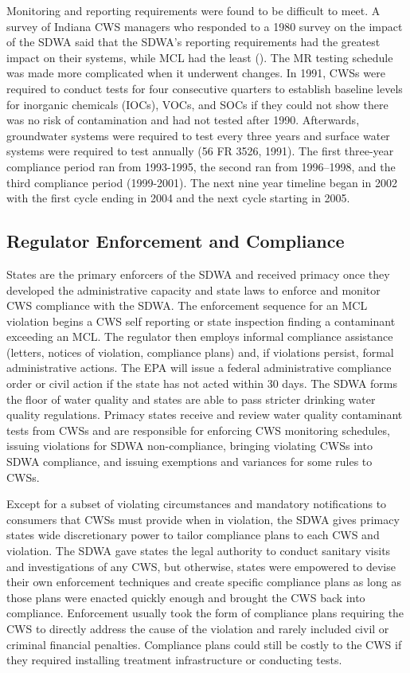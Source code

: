 \documentclass{article}
\begin{document}
Monitoring and reporting requirements were found to be difficult to meet. A survey of Indiana CWS managers who responded to a 1980 survey on the impact of the SDWA said that the SDWA's reporting requirements had the greatest impact on their systems, while MCL had the least (\cite{oleckno1982national}). The MR testing schedule was made more complicated when it underwent changes. In 1991, CWSs were required to conduct tests for four consecutive quarters to establish baseline levels for inorganic chemicals (IOCs), VOCs, and SOCs if they could not show there was no risk of contamination and had not tested after 1990. Afterwards, groundwater systems were required to test every three years and surface water systems were required to test annually (56 FR 3526, 1991). The first three-year compliance period ran from 1993-1995, the second ran from 1996–1998, and the third compliance period (1999-2001). The next nine year timeline began in 2002 with the first cycle ending in 2004 and the next cycle starting in 2005.

\subsection{Regulator Enforcement and Compliance}

States are the primary enforcers of the SDWA and received primacy once they developed the administrative capacity and state laws to enforce and monitor CWS compliance with the SDWA. The enforcement sequence for an MCL violation begins a CWS self reporting or state inspection finding a contaminant exceeding an MCL. The regulator then employs informal compliance assistance (letters, notices of violation, compliance plans) and, if violations persist, formal administrative actions. The EPA will issue a federal administrative compliance order or civil action if the state has not acted within 30 days. The SDWA forms the floor of water quality and states are able to pass stricter drinking water quality regulations. Primacy states receive and review water quality contaminant tests from CWSs and are responsible for enforcing CWS monitoring schedules, issuing violations for SDWA non-compliance, bringing violating CWSs into SDWA compliance, and issuing exemptions and variances for some rules to CWSs. 

Except for a subset of violating circumstances and mandatory notifications to consumers that CWSs must provide when in violation, the SDWA gives primacy states wide discretionary power to tailor compliance plans to each CWS and violation. The SDWA gave states the legal authority to conduct sanitary visits and investigations of any CWS, but otherwise, states were empowered to devise their own enforcement techniques and create specific compliance plans as long as those plans were enacted quickly enough and brought the CWS back into compliance. Enforcement usually took the form of compliance plans requiring the CWS to directly address the cause of the violation and rarely included civil or criminal financial penalties. Compliance plans could still be costly to the CWS if they required installing treatment infrastructure or conducting tests. 
\end{document}
